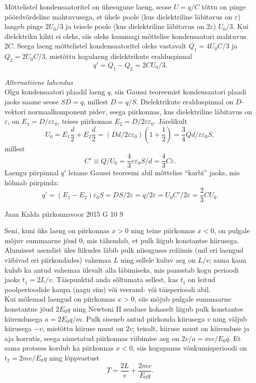 \documentclass[11pt, twoside]{article}
\begin{document}
{{Mõttelistel kondensaatoritel on ühesugune laeng, seose $U=q/C$ tõttu on pinge pöördvõrdeline mahtuvusega, st ühele poole (kus dielektriline läbitavus on $\varepsilon$) langeb pinge $2U_0/3$ ja teisele poole (kus dielektriline läbitavus on $2\varepsilon$) $U_0/3$. Kui dielektriku kihti ei oleks, siis oleks kummagi mõttelise kondensaatori mahtuvus $2C$. Seega laeng mõttelistel kondensaatoritel oleks vastavalt $Q_1=4U_0C/3$ ja $Q_2=2U_0C/3$, mistõttu kogulaeng dielektrikute eralduspinnal
\[
q'=Q_1-Q_2=2CU_0/3.
\]
\vspace{0.5\baselineskip}

\emph{Alternatiivne lahendus}\\
Olgu kondensaatori plaadil laeng $q$, siis Gaussi teoreemist kondensaatori plaadi jaoks saame seose $SD=q$, millest $D=q/S$. Dielektrikute eralduspinnal on $D$-vektori normaalkomponent pidev, seega piirkonnas, kus dielektriline läbitavus on $\varepsilon$, on $E_1=D/\varepsilon\varepsilon_0$, teises piirkonnas $E_2=D/2\varepsilon\varepsilon_0$. Järelikult
\[
U_0=E_1\frac d2+E_2\frac d2=(Dd/2\varepsilon\varepsilon_0)(1+\frac 12)=\frac 34Qd/\varepsilon\varepsilon_0S,
\]
millest
\[
C'\equiv Q/U_0=\frac 43\varepsilon\varepsilon_0S/d=\frac 43C\varepsilon.
\]
Laengu piirpinnal $q'$ leiame Gaussi teoreemi abil mõttelise \enquote{karbi} jaoks, mis hõlmab piirpinda: 
\[
q'=(E_1-E_2)\varepsilon_0S=DS/2\varepsilon=q/2\varepsilon=U_0C'/2\varepsilon=\frac 23CU_0.
\]
\fi
}

{Jaan Kalda} %
{piirkonnavoor} %
{2015} %
{G 10} %
{9} %
{

\ifSolution
\osa Seni, kuni üks laeng on piirkonnas $x>0$ ning teine piirkonnas $x<0$, on pulgale mõjuv summaarne jõud \num{0}, mis tähendab, et pulk liigub konstantse kiirusega. \\
Alumisest asendist üles liikudes läbib pulk niisuguses re\v ziimis
(mil eri laengud viibivad eri piirkondades) vahemaa $L$ ning
sellele kuluv aeg on $L/v$; sama kaua kulub ka antud vahemaa ülevalt alla
läbimiseks, mis panustab kogu perioodi jaoks $t_1=2L/v$.
Täispunktid anda sõltumata sellest, kas $t_1$ on leitud poolperioodide kaupa (nagu siin) või veerand- või täisperioodi abil.\\
Kui mõlemad laengud on piirkonnas $x> 0$, siis mõjub pulgale summaarne konstantne jõud $2E_0q$
ning Newtoni II seaduse kohaselt liigub pulk konstantse kiirendusega
$a=2E_0q/m$. Pulk siseneb antud piirkonda kiirusega $v$ ning väljub kiirusega $-v$, mistõttu kiiruse muut on $2v$; teisalt,
kiiruse muut on kiirenduse ja aja korrutis, seega nimetatud piirkonnas viibimise
aeg on $2v/a=mv/E_0q$. Et sama protsess kordub ka piirkonnas $x<0$, siis
kogupanus võnkumisperioodi on $t_2=2mv/E_0q$ ning lõppvastust
\[ T=\frac{2L}v+\frac {2mv}{E_0q}. \]

}}
\end{document}
